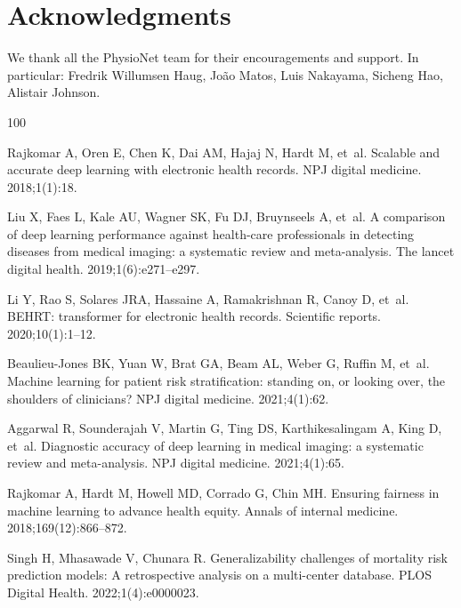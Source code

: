 \documentclass[10pt,letterpaper]{article}
\begin{document}
\section*{Acknowledgments}

We thank all the PhysioNet team for their encouragements and support. In
particular: Fredrik Willumsen Haug, João Matos, Luis Nakayama, Sicheng Hao, Alistair Johnson.

\nolinenumbers

\begin{thebibliography}{100}

  Rajkomar A, Oren E, Chen K, Dai AM, Hajaj N, Hardt M, et~al.
  \newblock Scalable and accurate deep learning with electronic health records.
  \newblock NPJ digital medicine. 2018;1(1):18.

  Liu X, Faes L, Kale AU, Wagner SK, Fu DJ, Bruynseels A, et~al.
  \newblock A comparison of deep learning performance against health-care professionals in detecting diseases from medical imaging: a systematic review and meta-analysis.
  \newblock The lancet digital health. 2019;1(6):e271--e297.

  Li Y, Rao S, Solares JRA, Hassaine A, Ramakrishnan R, Canoy D, et~al.
  \newblock BEHRT: transformer for electronic health records.
  \newblock Scientific reports. 2020;10(1):1--12.

  Beaulieu-Jones BK, Yuan W, Brat GA, Beam AL, Weber G, Ruffin M, et~al.
  \newblock Machine learning for patient risk stratification: standing on, or looking over, the shoulders of clinicians?
  \newblock NPJ digital medicine. 2021;4(1):62.

  Aggarwal R, Sounderajah V, Martin G, Ting DS, Karthikesalingam A, King D, et~al.
  \newblock Diagnostic accuracy of deep learning in medical imaging: a systematic review and meta-analysis.
  \newblock NPJ digital medicine. 2021;4(1):65.

  Rajkomar A, Hardt M, Howell MD, Corrado G, Chin MH.
  \newblock Ensuring fairness in machine learning to advance health equity.
  \newblock Annals of internal medicine. 2018;169(12):866--872.

  Singh H, Mhasawade V, Chunara R.
  \newblock Generalizability challenges of mortality risk prediction models: A retrospective analysis on a multi-center database.
  \newblock PLOS Digital Health. 2022;1(4):e0000023.


\end{thebibliography}
\end{document}
